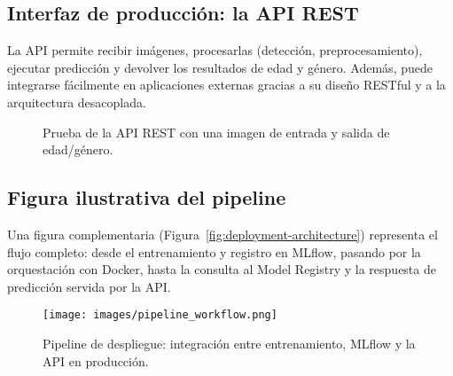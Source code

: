 \subsection{Interfaz de producción: la API REST}
La API permite recibir imágenes, procesarlas (detección, preprocesamiento), ejecutar predicción y devolver los resultados de edad y género. 
Además, puede integrarse fácilmente en aplicaciones externas gracias a su diseño RESTful y a la arquitectura desacoplada.

\begin{figure}[h]
\centering
\caption{Prueba de la API REST con una imagen de entrada y salida de edad/género.}
\label{fig:api-frontend}
\end{figure}

\subsection{Figura ilustrativa del pipeline}
Una figura complementaria (Figura~\ref{fig:deployment-architecture}) representa el flujo completo: 
desde el entrenamiento y registro en MLflow, pasando por la orquestación con Docker, hasta la consulta al Model Registry y la respuesta de predicción servida por la API.

\begin{figure}[h]
\centering
\texttt{[image: images/pipeline\_workflow.png]}
\caption{Pipeline de despliegue: integración entre entrenamiento, MLflow y la API en producción.}
\label{fig:pipeline_workflow}
\end{figure}
